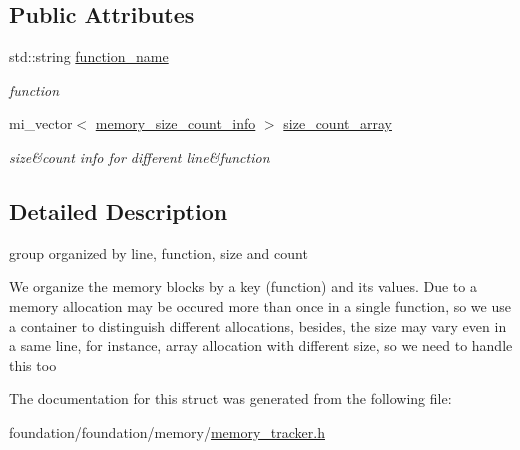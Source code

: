 \subsection*{Public Attributes}
\begin{DoxyCompactItemize}
\item 
\mbox{\label{structminerva_1_1foundation_1_1memory__tracker_1_1memory__group_a13b93feaacbc98de0a5978420897ea29}} 
std\+::string \hyperlink{structminerva_1_1foundation_1_1memory__tracker_1_1memory__group_a13b93feaacbc98de0a5978420897ea29}{function\+\_\+name}
\begin{DoxyCompactList}\small\item\em function \end{DoxyCompactList}\item 
\mbox{\label{structminerva_1_1foundation_1_1memory__tracker_1_1memory__group_a3de304ca6ef752b29198b97fde2208f4}} 
mi\+\_\+vector$<$ \hyperlink{structminerva_1_1foundation_1_1memory__tracker_1_1memory__size__count__info}{memory\+\_\+size\+\_\+count\+\_\+info} $>$ \hyperlink{structminerva_1_1foundation_1_1memory__tracker_1_1memory__group_a3de304ca6ef752b29198b97fde2208f4}{size\+\_\+count\+\_\+array}
\begin{DoxyCompactList}\small\item\em size\&count info for different line\&function \end{DoxyCompactList}\end{DoxyCompactItemize}


\subsection{Detailed Description}
group organized by line, function, size and count 

We organize the memory blocks by a key (function) and it\textquotesingle{}s values. Due to a memory allocation may be occured more than once in a single function, so we use a container to distinguish different allocations, besides, the size may vary even in a same line, for instance, array allocation with different size, so we need to handle this too 

The documentation for this struct was generated from the following file\+:\begin{DoxyCompactItemize}
\item 
foundation/foundation/memory/\hyperlink{memory__tracker_8h}{memory\+\_\+tracker.\+h}\end{DoxyCompactItemize}
